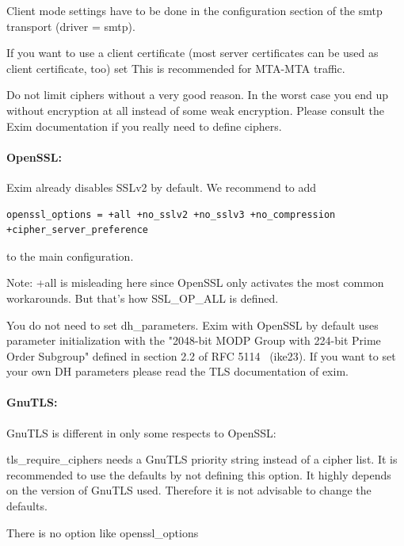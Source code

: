 Client mode settings have to be done in the configuration section of the smtp transport (driver = smtp).

If you want to use a client certificate (most server certificates can be used as client certificate, too) set
This is recommended for MTA-MTA traffic.

Do not limit ciphers without a very good reason. In the worst case you end up without encryption at all instead of some weak encryption. Please consult the Exim documentation if you really need to define ciphers.

\paragraph{OpenSSL:}
Exim already disables SSLv2 by default. We recommend to add
\begin{lstlisting}
openssl_options = +all +no_sslv2 +no_sslv3 +no_compression +cipher_server_preference
\end{lstlisting}
to the main configuration.

Note: +all is misleading here since OpenSSL only activates the most common workarounds. But that's how SSL\_OP\_ALL is defined.

You do not need to set dh\_parameters. Exim with OpenSSL by default uses parameter initialization with the "2048-bit MODP Group with 224-bit Prime Order Subgroup" defined in section 2.2 of RFC 5114~\cite{rfc5114} (ike23).
If you want to set your own DH parameters please read the TLS documentation of exim.


\paragraph{GnuTLS:}
GnuTLS is different in only some respects to OpenSSL:
\begin{itemize*}
  \item tls\_require\_ciphers needs a GnuTLS priority string instead of a cipher list. It is recommended to use the defaults by not defining this option. It highly depends on the version of GnuTLS used. Therefore it is not advisable to change the defaults.
  \item There is no option like openssl\_options
\end{itemize*}

